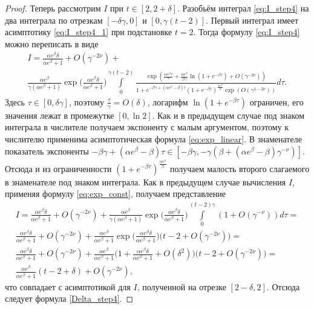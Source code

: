 \begin{proof}
Теперь рассмотрим $I$ при $t \in [2, 2 + \delta]$. Разобьём интеграл \eqref{eq:I_step4} на два интеграла по отрезкам $[-\delta\gamma, 0]$ и  $[0, \gamma (t - 2)]$. Первый интеграл имеет асимптотику \eqref{eq:I_step4_1} при подстановке $t = 2$. Тогда формулу \eqref{eq:I_step4} можно переписать в виде
\small
\begin{multline}
	\label{eq:I_step4_2}
	I=\frac{\alpha e^\beta\delta}{\alpha e^\beta+1}+O(\gamma^{-2\nu})+
	\\
	\frac{\alpha e^\beta}{\gamma(\alpha e^{\beta}+1)}\exp\Big(\frac{\alpha e^{\beta}\delta}{\alpha e^\beta+1}\Big)
	\int\limits_{0}^{\gamma(t - 2)}\frac{\exp( \frac{\alpha e^\beta\tau}{\gamma}+\frac{\alpha e^\beta}{\beta\gamma}\ln(1+e^{-\beta\tau}) +O(\gamma^{-2\nu}))}{1+e^{-\beta\gamma+(\alpha e^\beta-\beta)\tau}(1+e^{-\beta\tau})^\frac{\alpha e^\beta}{\beta}\exp(O(\gamma^{1 - 2\nu}))}d\tau.
\end{multline}
\normalsize
Здесь $\tau \in [0,\delta\gamma]$, поэтому $\frac{\tau}{\gamma} = O(\delta)$, логарифм $\ln(1 + e^{-\beta\tau})$ ограничен, его значения лежат в промежутке $[0,\ln 2]$. Как и в предыдущем случае под знаком интеграла в числителе получаем экспоненту с малым аргументом, поэтому к числителю применима асимптотическая формула \eqref{eq:exp_linear}. В знаменателе показатель экспоненты $-\beta\gamma + (\alpha e^\beta - \beta) \tau \in [-\beta\gamma, -\gamma(\beta + (\alpha e^\beta - \beta) \gamma^{-\nu})]$. Отсюда и из ограниченности $(1 + e^{-\beta\tau})^\frac{\alpha e^\beta}{\beta}$ получаем малость второго слагаемого в знаменателе под знаком интеграла. Как в предыдущем случае вычисления $I$, применяя формулу \eqref{eq:exp_const}, получаем представление
%
\small
\begin{multline*}
	I=\frac{\alpha e^\beta\delta}{\alpha e^\beta+1}+O(\gamma^{-2\nu})+
	\frac{\alpha e^\beta}{\gamma(\alpha e^{\beta}+1)}\exp\Big(\frac{\alpha e^{\beta}\delta}{\alpha e^\beta+1}\Big)
	\int\limits_{0}^{(t-2)\gamma}(1+O(\gamma^{-\nu}))d\tau=
	\\
	\frac{\alpha e^\beta\delta}{\alpha e^\beta+1}+O(\gamma^{-2\nu})+
	\frac{\alpha e^\beta}{\alpha e^{\beta}+1}\exp\Big(\frac{\alpha e^{\beta}\delta}{\alpha e^\beta+1}\Big)\big(
	t-2+O(\gamma^{-2\nu})\big)=
	\\
	\frac{\alpha e^\beta\delta}{\alpha e^\beta+1}+O(\gamma^{-2\nu})+
	\frac{\alpha e^\beta}{\alpha e^{\beta}+1}\Big(1+\frac{\alpha e^{\beta}\delta}{\alpha e^\beta+1}+O(\delta^2)\Big)\big(
	t-2+O(\gamma^{-2\nu})\big)=
	\\
	\frac{\alpha e^\beta}{\alpha e^{\beta}+1}(
	t-2+\delta)+O(\gamma^{-2\nu}),
\end{multline*}
\normalsize
что совпадает с асимптотикой для $I$, полученной на отрезке $[2 - \delta, 2]$.
Отсюда следует формула \eqref{Delta_step4}. 


\end{proof}

